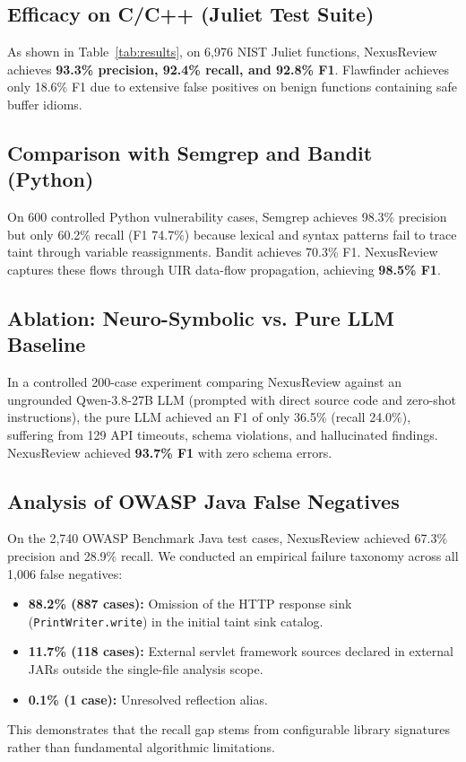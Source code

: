 \documentclass[10pt,conference]{IEEEtran}
\begin{document}
\subsection{Efficacy on C/C++ (Juliet Test Suite)}
As shown in Table~\ref{tab:results}, on 6{,}976 NIST Juliet functions, NexusReview achieves \textbf{93.3\% precision, 92.4\% recall, and 92.8\% F1}. Flawfinder achieves only 18.6\% F1 due to extensive false positives on benign functions containing safe buffer idioms.

\subsection{Comparison with Semgrep and Bandit (Python)}
On 600 controlled Python vulnerability cases, Semgrep achieves 98.3\% precision but only 60.2\% recall (F1 74.7\%) because lexical and syntax patterns fail to trace taint through variable reassignments. Bandit achieves 70.3\% F1. NexusReview captures these flows through UIR data-flow propagation, achieving \textbf{98.5\% F1}.

\subsection{Ablation: Neuro-Symbolic vs. Pure LLM Baseline}
In a controlled 200-case experiment comparing NexusReview against an ungrounded Qwen-3.8-27B LLM (prompted with direct source code and zero-shot instructions), the pure LLM achieved an F1 of only 36.5\% (recall 24.0\%), suffering from 129 API timeouts, schema violations, and hallucinated findings. NexusReview achieved \textbf{93.7\% F1} with zero schema errors.

\subsection{Analysis of OWASP Java False Negatives}
On the 2{,}740 OWASP Benchmark Java test cases, NexusReview achieved 67.3\% precision and 28.9\% recall. We conducted an empirical failure taxonomy across all 1{,}006 false negatives:
\begin{itemize}
    \item \textbf{88.2\% (887 cases):} Omission of the HTTP response sink (\texttt{PrintWriter.write}) in the initial taint sink catalog.
    \item \textbf{11.7\% (118 cases):} External servlet framework sources declared in external JARs outside the single-file analysis scope.
    \item \textbf{0.1\% (1 case):} Unresolved reflection alias.
\end{itemize}
This demonstrates that the recall gap stems from configurable library signatures rather than fundamental algorithmic limitations.
\end{document}
